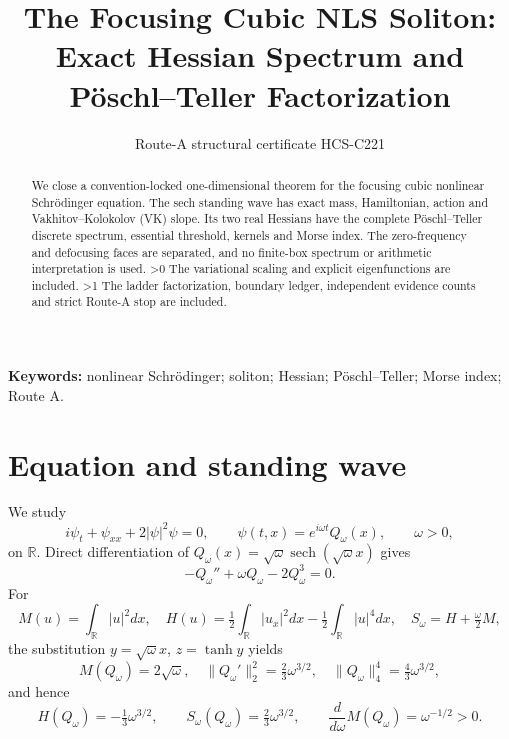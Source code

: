 \documentclass[9pt]{extarticle}
\title{The Focusing Cubic NLS Soliton:\\Exact Hessian Spectrum and Pöschl--Teller Factorization}
\author{Route-A structural certificate HCS-C221}
\date{}
\newcommand{\R}{\mathbb R}
\newcommand{\sech}{\operatorname{sech}}
\begin{document}
\maketitle
\begin{abstract}
We close a convention-locked one-dimensional theorem for the focusing cubic
nonlinear Schrödinger equation.  The sech standing wave has exact mass,
Hamiltonian, action and Vakhitov--Kolokolov (VK) slope.  Its two real Hessians have
the complete Pöschl--Teller discrete spectrum, essential threshold, kernels and
Morse index.  The zero-frequency and defocusing faces are separated, and no
finite-box spectrum or arithmetic interpretation is used.
\ifnum\CRevisionRound>0
The variational scaling and explicit eigenfunctions are included.
\fi
\ifnum\CRevisionRound>1
The ladder factorization, boundary ledger, independent evidence counts and
strict Route-A stop are included.
\fi
\end{abstract}
\noindent\textbf{Keywords:} nonlinear Schrödinger; soliton; Hessian;
Pöschl--Teller; Morse index; Route A.

\section{Equation and standing wave}
We study
\begin{equation}
 i\psi_t+\psi_{xx}+2|\psi|^2\psi=0,
 \qquad \psi(t,x)=e^{i\omega t}Q_\omega(x),\qquad \omega>0,
\end{equation}
on \(\R\).  Direct differentiation of
\(Q_\omega(x)=\sqrt\omega\sech(\sqrt\omega x)\) gives
\begin{equation}
 -Q_\omega''+\omega Q_\omega-2Q_\omega^3=0.
\end{equation}
For
\[
 M(u)=\int_\R|u|^2dx,\quad
 H(u)=\tfrac12\int_\R|u_x|^2dx-\tfrac12\int_\R|u|^4dx,
 \quad S_\omega=H+\tfrac\omega2M,
\]
the substitution \(y=\sqrt\omega x\), \(z=\tanh y\) yields
\begin{equation}
 M(Q_\omega)=2\sqrt\omega,\quad
 \|Q_\omega'\|_2^2=\tfrac23\omega^{3/2},\quad
 \|Q_\omega\|_4^4=\tfrac43\omega^{3/2},
\end{equation}
and hence
\begin{equation}
 H(Q_\omega)=-\tfrac13\omega^{3/2},\qquad
 S_\omega(Q_\omega)=\tfrac23\omega^{3/2},\qquad
 \frac{d}{d\omega}M(Q_\omega)=\omega^{-1/2}>0.
\end{equation}
\end{document}
